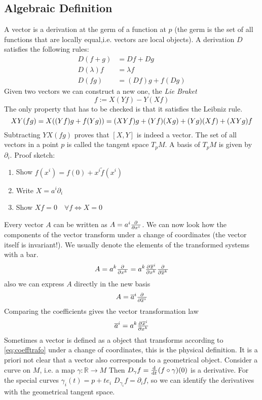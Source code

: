 \subsection*{Algebraic Definition}
A vector is a derivation at the germ of a function at $p$ 
(the germ is the set of all functions that are locally equal,i.e. vectors are local objects). 
A derivation $D$ satisfies the following rules:
\begin{align*}
    D(f+g) &=Df+Dg\\
    D(\lambda)f&=\lambda f\\
    D(fg)&= (Df)g+f(Dg)
\end{align*}
Given two vectors we can construct a new one, the \emph{Lie Braket}
\begin{equation}
    [X,Y]f:=X(Yf)-Y(Xf)
\end{equation}
The only property that has to be checked is that it satisfies the Leibniz rule.
\begin{equation*}
    XY(fg)=X((Yf)g+f(Yg))=(XYf)g+(Yf)(Xg)+(Yg)(Xf)+(XYg)f\\
\end{equation*}
Subtracting $YX(fg)$ proves that $[X,Y]$ is indeed a vector.
The set of all vectors in a point $p$ is called the tangent space $T_pM$. A basis of $T_pM$ is given by $\partial_i$.
Proof sketch:
\begin{enumerate}
    \item Show $f(x^i)=f(0)+x^i\tilde{f}(x^i)$
    \item Write $X=a^i\partial_i$
    \item Show $Xf=0\quad \forall f \iff X=0$
\end{enumerate}
Every vector $A$ can be written as $A=a^i\pd{}{{x^i}}$. We can now look how the components of the vector transform 
under a change of coordinates (the vector itself is invariant!). We usually denote the elements of the transformed systems with a bar.
\begin{equation}
    A= a^k\pd{}{{x^k}}= a^k\pd{\overline{x}^i}{{x^k}}\pd{}{{\overline{x}^k}}
\end{equation}
also we can express $A$ directly in the new basis
\begin{equation}
    A= \overline{a}^i\pd{}{{\overline{x}^i}}
\end{equation}
Comparing the coefficients gives the vector transformation law
\begin{equation}
    \overline{a}^i=a^k\pd{\overline{x}^i}{{x^k}}\label{eq:coefftrafo}
\end{equation}
Sometimes a vector is defined as a object that transforms according to \ref{eq:coefftrafo} under a change of coordinates, 
this is the physical definition. It is a priori not clear that a vector also corresponds to a geometrical object. 
Consider a curve on $M$, i.e. a map $\gamma:\mathbb{R}\to M$
Then $D_\gamma f=\od{}{t}(f\circ\gamma)(0)$ is a derivative.
For the special curves $\gamma_i(t)=p+te_i$
$D_{\gamma_i} f=\partial_if$, so we can identify the derivatives with the geometrical tangent space.


